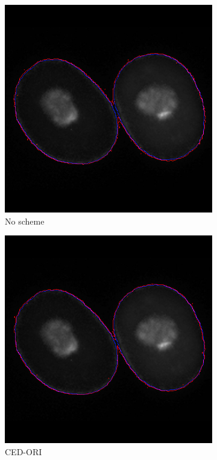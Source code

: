 \documentclass[a4paper,11pt]{ijamas}
\begin{document}
{\begin{figure}
\begin{subfigure}{.25\textwidth}
  \centering
  \includegraphics[width=0.80\columnwidth]{./figs/results/1no.jpg}
 \caption{No scheme}
  \label{fig:noseg_1}
\end{subfigure}%
\begin{subfigure}{.25\textwidth}
  \centering
  \includegraphics[width=0.80\columnwidth]{./figs/results/1ced.jpg}
 \caption{CED-ORI}
  \label{fig:cedseg_1}
\end{subfigure}%
\begin{subfigure}{.25\textwidth}
  \centering

\end{subfigure}
\end{figure}}
\end{document}
